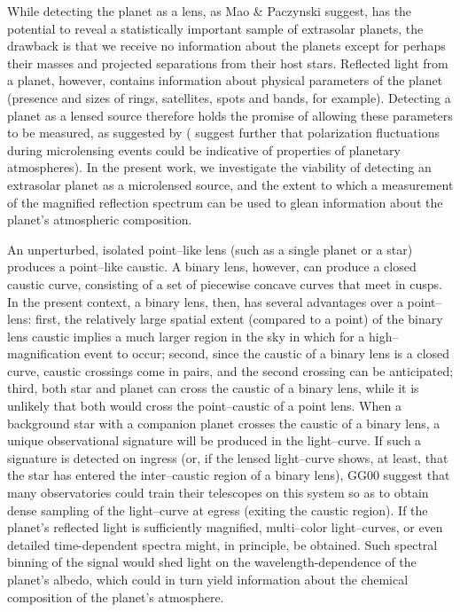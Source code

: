 While detecting the planet as a lens, as Mao \& Paczynski suggest, has
the potential to reveal a statistically important sample of extrasolar
planets, the drawback is that we receive no information about the
planets except for perhaps their masses and projected separations from
their host stars.  Reflected light from a planet, however, contains
information about physical parameters of the planet (presence and
sizes of rings, satellites, spots and bands, for example).  Detecting
a planet as a lensed source therefore holds the promise of allowing
these parameters to be measured, as suggested by \citet[hereafter
GCH03]{gaudi_chang_han2003} (\citet{lewis+ibata2000} suggest further
that polarization fluctuations during microlensing events could be
indicative of properties of planetary atmospheres).  In the present
work, we investigate the viability of detecting an extrasolar planet
as a microlensed source, and the extent to which a measurement of the
magnified reflection spectrum can be used to glean information about
the planet's atmospheric composition.

An unperturbed, isolated point--like lens (such as a single planet or
a star) produces a point--like caustic.  A binary lens, however, can
produce a closed caustic curve, consisting of a set of piecewise
concave curves that meet in cusps.  In the present context, a binary
lens, then, has several advantages over a point--lens: first, the
relatively large spatial extent (compared to a point) of the binary
lens caustic implies a much larger region in the sky in which for a
high--magnification event to occur; second, since the caustic of a
binary lens is a closed curve, caustic crossings come in pairs, and
the second crossing can be anticipated; third, both star and planet
can cross the caustic of a binary lens, while it is unlikely that both
would cross the point--caustic of a point lens.  When a background
star with a companion planet crosses the caustic of a binary lens, a
unique observational signature will be produced in the light--curve.
If such a signature is detected on ingress (or, if the lensed
light--curve shows, at least, that the star has entered the
inter--caustic region of a binary lens), GG00 suggest that many
observatories could train their telescopes on this system so as to
obtain dense sampling of the light--curve at egress (exiting the
caustic region).  If the planet's reflected light is sufficiently
magnified, multi--color light--curves, or even detailed time-dependent
spectra might, in principle, be obtained.  Such spectral binning of
the signal would shed light on the wavelength-dependence of the
planet's albedo, which could in turn yield information about the
chemical composition of the planet's atmosphere.

